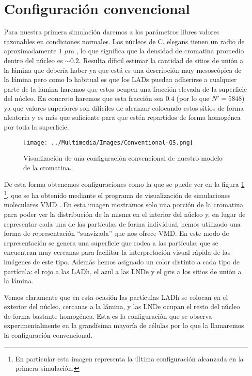 \section{Configuración convencional}

Para nuestra primera simulación daremos a los parámetros libres valores razonables en condiciones normales. Los núcleos de C. elegans tienen un radio de aproximadamente $1$ $\mu$m \cite{Ikegami2010}, lo que significa que la densidad de cromatina promedio dentro del núcleo es $\sim 0.2$. Resulta díficil estimar la cantidad de sitios de unión a la lámina que debería haber ya que está es una descripción muy mesoscópica de la lámina pero como lo habitual es que los LADs puedan adherirse a cualquier parte de la lámina haremos que estos ocupen una fracción elevada de la superficie del núcleo. En concreto haremos que esta fracción sea $0.4$ (por lo que $N'=5848$) ya que valores superiores son díficiles de alcanzar colocando estos sitios de forma aleatoria y es más que suficiente para que estén repartidos de forma homogénea por toda la superficie.

\begin{figure}[t]
    \centering
    \texttt{[image: ../Multimedia/Images/Conventional-QS.png]}
    \caption{Visualización de una configuración convencional de nuestro modelo de la cromatina.}
    \label{fig:vmd_QS_image_c}
\end{figure}

De esta forma obtenemos configuraciones como la que se puede ver en la figura \ref{fig:vmd_QS_image_c} \footnote{En particular esta imagen representa la última configuración alcanzada en la primera simulación.}, que se ha obtenido mediante el programa de visualización de simulaciones moleculares VMD \cite{Humphrey96}. En esta imagen mostramos solo una porción de la cromatina para poder ver la distribución de la misma en el interior del núcleo y, en lugar de representar cada una de las partículas de forma individual, hemos utilizado una forma de representación ``suavizada'' que nos ofrece VMD. En este modo de representación se genera una superficie que rodea a las partículas que se encuentran muy cercanas para facilitar la interpretación visual rápida de las imágenes de este tipo. Además hemos asignado un color distinto a cada tipo de partícula: el rojo a las LADh, el azul a las LNDe y el gris a los sitios de unión a la lámina.

Vemos claramente que en esta ocasión las partículas LADh se colocan en el exterior del núcleo, cercanas a la lámina, y las LNDe ocupan el resto del núcleo de forma bastante homogénea. Esta es la configuración que se observa experimentalmente en la grandísima mayoría de células \cite{Camara2023} por lo que la llamaremos la configuración convencional.


